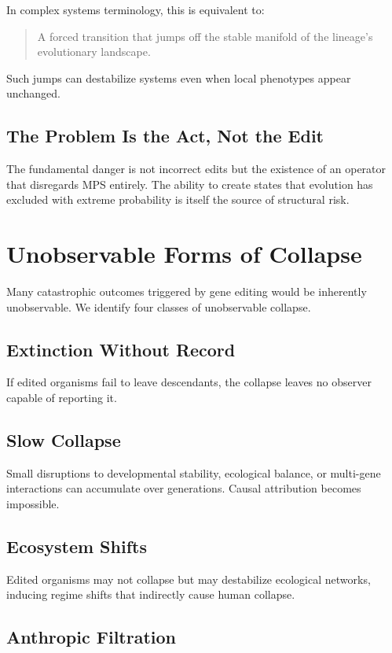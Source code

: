 \documentclass[11pt]{article}
\begin{document}
In complex systems terminology, this is equivalent to:
\begin{quote}
A forced transition that jumps off the stable manifold of the lineage's evolutionary landscape.
\end{quote}

Such jumps can destabilize systems even when local phenotypes appear unchanged.

\subsection{The Problem Is the Act, Not the Edit}

The fundamental danger is not incorrect edits but the existence of an operator that disregards MPS entirely. The ability to create states that evolution has excluded with extreme probability is itself the source of structural risk.

\section{Unobservable Forms of Collapse}

Many catastrophic outcomes triggered by gene editing would be inherently unobservable. We identify four classes of unobservable collapse.

\subsection{Extinction Without Record}

If edited organisms fail to leave descendants, the collapse leaves no observer capable of reporting it.

\subsection{Slow Collapse}

Small disruptions to developmental stability, ecological balance, or multi-gene interactions can accumulate over generations. Causal attribution becomes impossible.

\subsection{Ecosystem Shifts}

Edited organisms may not collapse but may destabilize ecological networks, inducing regime shifts that indirectly cause human collapse.

\subsection{Anthropic Filtration}
\end{document}
